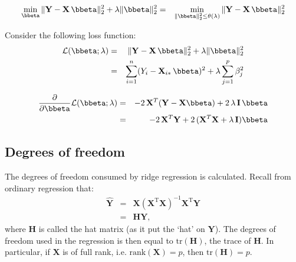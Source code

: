 \documentclass[a4paper]{article}
\theoremstyle{myexamplestyle}
\begin{document}
\begin{eqnarray*}
\min_{\bbeta} \| \mathbf{Y} - \mathbf{X} \, \bbeta \|^2_2 + \lambda \| \bbeta \|^2_2
& = & \min_{\| \bbeta \|_2^2 \leq \theta(\lambda)} \| \mathbf{Y} - \mathbf{X} \, \bbeta \|^2_2
\end{eqnarray*}

Consider the following loss function:
\begin{eqnarray*}
\mathcal{L}(\bbeta; \lambda) & = & \| \mathbf{Y} - \mathbf{X} \, \bbeta \|^2_2 + \lambda \| \bbeta \|^2_2
\\
& = & \sum_{i=1}^n (Y_i - \mathbf{X}_{i\ast} \, \bbeta)^2 + \lambda \sum_{j=1}^p \beta_j^2
\end{eqnarray*}

\begin{eqnarray*}
\frac{\partial}{\partial \bbeta} \mathcal{L}(\bbeta; \lambda) & = & -2 \, \mathbf{X}^T (\mathbf{Y} - \mathbf{X} \bbeta)  + 2 \, \lambda \, \mathbf{I} \, \bbeta
\\
& = & -2 \, \mathbf{X}^T \mathbf{Y} + 2 \, ( \mathbf{X}^T \mathbf{X} + \lambda \, \mathbf{I}) \bbeta
\end{eqnarray*}




\subsection{Degrees of freedom}
The degrees of freedom consumed by ridge regression is calculated. Recall from ordinary regression that:
\begin{eqnarray*}
\hat{\mathbf{Y}} & = & \mathbf{X} (\mathbf{X}^{\mathrm{T}} \mathbf{X})^{-1} \mathbf{X}^{\mathrm{T}} \mathbf{Y}
\\
& = & \mathbf{H} \mathbf{Y},
\end{eqnarray*}
where $\mathbf{H}$ is called the hat matrix (as it put the `hat' on $\mathbf{Y}$). The degrees of freedom used in the regression is then equal to $\mbox{tr}(\mathbf{H})$, the trace of $\mathbf{H}$. In particular, if $ \mathbf{X}$ is of full rank, i.e. $\mbox{rank}(\mathbf{X}) = p$, then $\mbox{tr}(\mathbf{H}) = p$.
\end{document}
